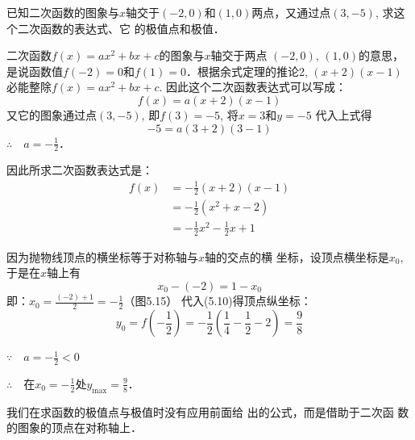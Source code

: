 \begin{example}
    已知二次函数的图象与$x$轴交于$(-2,0)$和$(1,
0)$两点，又通过点$(3,-5)$, 求这个二次函数的表达式、它
的极值点和极值．
\end{example}

\begin{solution}
二次函数$f(x)=ax^2+bx+c$的图象与$x$轴交于两点
$(-2,0)$, $(1,0)$的意思，是说函数值$f(-2)=0$和$f(1)=
0$．根据余式定理的推论2, $(x+2)(x-1)$必能整除$f(x)=
ax^2+bx+c$. 因此这个二次函数表达式可以写成：
\[f(x)=a(x+2)(x-1)\]
又它的图象通过点$(3,-5)$, 即$f(3)=-5$, 将$x=3$和$y=-5$
代入上式得
\[-5=a(3+2)(3-1)\]
$\therefore\quad a=-\frac{1}{2}$．

因此所求二次函数表达式是：
\begin{equation}
    \begin{split}
        f(x)&=-\frac{1}{2}(x+2)(x-1)\\
        &=-\frac{1}{2}(x^2+x-2)\\
        &=-\frac{1}{2}x^2-\frac{1}{2}x+1
    \end{split}
\end{equation}

因为抛物线顶点的横坐标等于对称轴与$x$轴的交点的横
坐标，设顶点横坐标是$x_0$, 于是在$x$轴上有
    \[x_0-(-2)=1-x_0\]
    即：$x_0=\frac{(-2)+1}{2}=-\frac{1}{2}$（图5.15）
代入(5.10)得顶点纵坐标：
\[y_0=f\left(-\frac{1}{2}\right)=-\frac{1}{2}\left(\frac{1}{4}-\frac{1}{2}-2\right)=\frac{9}{8}\]

$\because\quad a=-\frac{1}{2}<0$

$\therefore\quad $在$x_0=-\frac{1}{2}$处$y_{\max}=\frac{9}{8}$．

\begin{figure}[htp]
    \centering

    \caption{}
\end{figure}
\end{solution}

\begin{rmk}
    我们在求函数的极值点与极值时没有应用前面给
出的公式，而是借助于二次函
数的图象的顶点在对称轴上．
\end{rmk}


